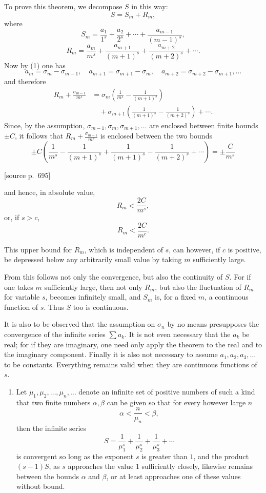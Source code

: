 \documentclass[11pt]{article}
\newcommand{\srcpage}[1]{\par\medskip\noindent\textsf{[source p.~#1]}\par\smallskip}
\begin{document}
To prove this theorem, we decompose $S$ in this way:
\[
S=S_m+R_m,
\]
where
\[
S_m=\frac{a_1}{1^s}+\frac{a_2}{2^s}+\cdots+\frac{a_{m-1}}{(m-1)^s},
\]
\[
R_m=\frac{a_m}{m^s}+\frac{a_{m+1}}{(m+1)^s}+\frac{a_{m+2}}{(m+2)^s}+\cdots .
\]
Now by (1) one has
\[
a_m=\sigma_m-\sigma_{m-1},\quad a_{m+1}=\sigma_{m+1}-\sigma_m,\quad
a_{m+2}=\sigma_{m+2}-\sigma_{m+1},\ldots
\]
and therefore
\[
\begin{aligned}
R_m+\frac{\sigma_{m-1}}{m^s}
&=\sigma_m\left(\frac1{m^s}-\frac1{(m+1)^s}\right)\\
&\quad+\sigma_{m+1}\left(\frac1{(m+1)^s}-\frac1{(m+2)^s}\right)+\cdots .
\end{aligned}
\]
Since, by the assumption, $\sigma_{m-1},\sigma_m,\sigma_{m+1},\ldots$ are enclosed between finite bounds $\pm C$, it follows that $R_m+\frac{\sigma_{m-1}}{m^s}$ is enclosed between the two bounds
\[
\pm C\left(\frac1{m^s}-\frac1{(m+1)^s}+\frac1{(m+1)^s}-\frac1{(m+2)^s}+\cdots\right)
=\pm\frac{C}{m^s}
\]

\srcpage{695}
and hence, in absolute value,
\[
R_m<\frac{2C}{m^s},
\]
or, if $s>c$,
\[
R_m<\frac{2C}{m^c}.
\]

This upper bound for $R_m$, which is independent of $s$, can however, if $c$ is positive, be depressed below any arbitrarily small value by taking $m$ sufficiently large.

From this follows not only the convergence, but also the continuity of $S$. For if one takes $m$ sufficiently large, then not only $R_m$, but also the fluctuation of $R_m$ for variable $s$, becomes infinitely small, and $S_m$ is, for a fixed $m$, a continuous function of $s$. Thus $S$ too is continuous.

It is also to be observed that the assumption on $\sigma_n$ by no means presupposes the convergence of the infinite series $\sum a_k$. It is not even necessary that the $a_k$ be real; for if they are imaginary, one need only apply the theorem to the real and to the imaginary component. Finally it is also not necessary to assume $a_1,a_2,a_3,\ldots$ to be constants. Everything remains valid when they are continuous functions of $s$.

\begin{enumerate}[label=\textbf{\arabic*.},leftmargin=2.2em,start=2]
\item Let $\mu_1,\mu_2,\ldots,\mu_n,\ldots$ denote an infinite set of positive numbers of such a kind that two finite numbers $\alpha,\beta$ can be given so that for every however large $n$
\begin{equation}
\alpha<\frac{n}{\mu_n}<\beta,
\tag{3}
\end{equation}
then the infinite series
\[
S=\frac1{\mu_1^s}+\frac1{\mu_2^s}+\frac1{\mu_3^s}+\cdots
\]
is convergent so long as the exponent $s$ is greater than $1$, and the product $(s-1)S$, as $s$ approaches the value $1$ sufficiently closely, likewise remains between the bounds $\alpha$ and $\beta$, or at least approaches one of these values without bound.
\end{enumerate}
\end{document}
